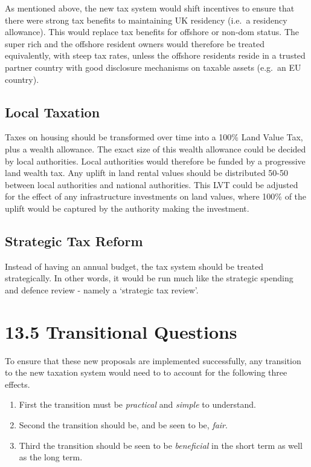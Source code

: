 \documentclass[]{tufte-handout}
\providecommand{\tightlist}{%
  \setlength{\itemsep}{0pt}\setlength{\parskip}{0pt}}
\begin{document}
As mentioned above, the new tax system would shift incentives to ensure
that there were strong tax benefits to maintaining UK residency (i.e.~a
residency allowance). This would replace tax benefits for offshore or
non-dom status. The super rich and the offshore resident owners would
therefore be treated equivalently, with steep tax rates, unless the
offshore residents reside in a trusted partner country with good
disclosure mechanisms on taxable assets (e.g.~an EU country).

\hypertarget{local-taxation}{%
\subsection{Local Taxation}\label{local-taxation}}

Taxes on housing should be transformed over time into a 100\% Land Value
Tax, plus a wealth allowance. The exact size of this wealth allowance
could be decided by local authorities. Local authorities would therefore
be funded by a progressive land wealth tax. Any uplift in land rental
values should be distributed 50-50 between local authorities and
national authorities. This LVT could be adjusted for the effect of any
infrastructure investments on land values, where 100\% of the uplift
would be captured by the authority making the investment.

\hypertarget{strategic-tax-reform}{%
\subsection{Strategic Tax Reform}\label{strategic-tax-reform}}

Instead of having an annual budget, the tax system should be treated
strategically. In other words, it would be run much like the strategic
spending and defence review - namely a `strategic tax review'.

\hypertarget{transitional-questions}{%
\section{13.5 Transitional Questions}\label{transitional-questions}}

To ensure that these new proposals are implemented successfully, any
transition to the new taxation system would need to to account for the
following three effects.

\begin{enumerate}
\def\labelenumi{\arabic{enumi})}
\tightlist
\item
  First the transition must be \emph{practical} and \emph{simple} to
  understand.
\item
  Second the transition should be, and be seen to be, \emph{fair}.
\item
  Third the transition should be seen to be \emph{beneficial} in the
  short term as well as the long term.
\end{enumerate}
\end{document}
